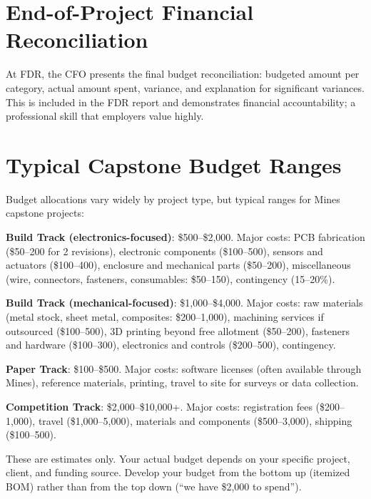 \section{End-of-Project Financial Reconciliation}
At FDR, the CFO presents the final budget reconciliation: budgeted amount per category, actual amount spent, variance, and explanation for significant variances. This is included in the FDR report and demonstrates financial accountability; a professional skill that employers value highly.



\section{Typical Capstone Budget Ranges}
Budget allocations vary widely by project type, but typical ranges for Mines capstone projects:

\textbf{Build Track (electronics-focused)}: \$500--\$2,000. Major costs: PCB fabrication (\$50--200 for 2 revisions), electronic components (\$100--500), sensors and actuators (\$100--400), enclosure and mechanical parts (\$50--200), miscellaneous (wire, connectors, fasteners, consumables: \$50--150), contingency (15--20\%).

\textbf{Build Track (mechanical-focused)}: \$1,000--\$4,000. Major costs: raw materials (metal stock, sheet metal, composites: \$200--1,000), machining services if outsourced (\$100--500), 3D printing beyond free allotment (\$50--200), fasteners and hardware (\$100--300), electronics and controls (\$200--500), contingency.

\textbf{Paper Track}: \$100--\$500. Major costs: software licenses (often available through Mines), reference materials, printing, travel to site for surveys or data collection.

\textbf{Competition Track}: \$2,000--\$10,000+. Major costs: registration fees (\$200--1,000), travel (\$1,000--5,000), materials and components (\$500--3,000), shipping (\$100--500).

These are estimates only. Your actual budget depends on your specific project, client, and funding source. Develop your budget from the bottom up (itemized BOM) rather than from the top down (``we have \$2,000 to spend'').

